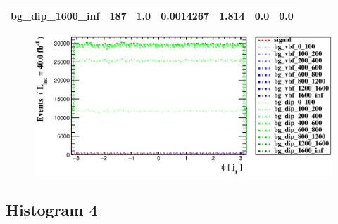 \documentclass[a4paper, 10pt]{article}
\begin{document}
\begin{table}[H]
\begin{center}
\begin{tabular}{|m{23.0mm}|m{23.0mm}|m{18.0mm}|m{19.0mm}|m{19.0mm}|m{19.0mm}|m{19.0mm}|}
      \hline
      {\cellcolor{white}         bg\_dip\_1600\_inf}& {\cellcolor{white}         187}& {\cellcolor{white}         1.0}& {\cellcolor{white}         0.0014267}& {\cellcolor{white}         1.814}& {\cellcolor{green}         0.0}& {\cellcolor{green}         0.0}\\
\hline
    \end{tabular}
  \end{center}
\end{table}

\begin{figure}[H]
  \begin{center}
    \includegraphics[scale=0.45]{selection_2.eps}\\
\caption{   }
  \end{center}
\end{figure}
      \newpage
\subsection{ Histogram 4}
\end{document}
